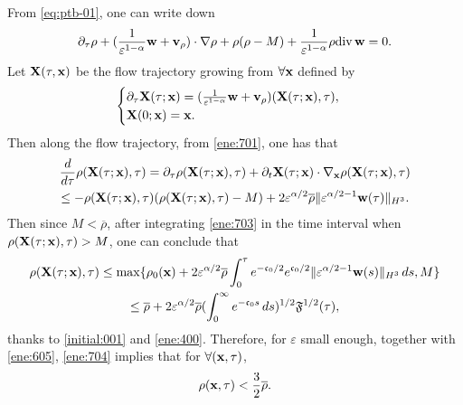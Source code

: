 \documentclass[11pt]{article}
\theoremstyle{plain}
\theoremstyle{definition}
\theoremstyle{remark}
\newcommand{\dt}{\partial_t}
\newcommand{\dtau}{\partial_\tau}
\newcommand{\dv}{\mathrm{div}\, }
\renewcommand{\vec}[1]{{\bf #1}}
\newcommand{\norm}[2]{\Vert #1 \Vert_{#2}}
\numberwithin{equation}{section}
\begin{document}
From \eqref{eq:ptb-01}, one can write down 
\begin{equation}
    \label{ene:701}
    \dtau \rho + (\frac{1}{\varepsilon^{1-\alpha}}\vec w + \vec v_\rho) \cdot \nabla \rho  + \rho (\rho - M)  + \frac{1}{\varepsilon^{1-\alpha}} \rho \dv \vec w  = 0.
\end{equation}
Let $ \vec X(\tau,\vec x) $ be the flow trajectory growing from $ \forall \vec x $ defined by
\begin{equation}
    \label{ene:702}
    \begin{cases}
        \partial_\tau \vec X(\tau; \vec x) = (\frac{1}{\varepsilon^{1-\alpha}}\vec w + \vec v_\rho) (\vec X(\tau; \vec x), \tau), \\
        \vec X(0;\vec x)=\vec x.
    \end{cases}
\end{equation}
Then along the flow trajectory, from \eqref{ene:701}, one has that
\begin{equation}
    \label{ene:703}
    \begin{gathered}
    \dfrac{d}{d\tau} \rho(\vec X(\tau; \vec x), \tau ) = \partial_\tau \rho (\vec X(\tau; \vec x), \tau ) + \dt \vec X(\tau;\vec x) \cdot \nabla_{\vec x} \rho (\vec X(\tau; \vec x), \tau ) \\
    \leq - \rho (\vec X(\tau; \vec x), \tau ) (\rho (\vec X(\tau; \vec x), \tau ) - M) + 2 \varepsilon^{\alpha/2} \overline \rho\norm{\varepsilon^{\alpha/2-1}\vec w(\tau)}{H^3}.
\end{gathered}
\end{equation}
Then since $ M < \overline \rho $, after integrating \eqref{ene:703} in the time interval when $ \rho(\vec X(\tau;\vec x),\tau) > M $, one can conclude that
\begin{equation}
    \label{ene:704}
\begin{gathered}
    \rho(\vec X(\tau;\vec x),\tau) \leq \max\lbrace \rho_0(\vec x) + 2 \varepsilon^{\alpha/2} \overline\rho \int_0^\tau  e^{-\mathfrak c_0/2} e^{\mathfrak c_0/2} \norm{\varepsilon^{\alpha/2-1}\vec w(s)}{H^3} \,ds, M \rbrace \\
    \leq \overline \rho + 2 \varepsilon^{\alpha/2} \overline \rho  (\int_0^\infty e^{-\mathfrak c_0s}\,ds)^{1/2} \mathfrak F^{1/2}(\tau),
\end{gathered}
\end{equation}
thanks to \eqref{initial:001} and \eqref{ene:400}. 
Therefore, for $ \varepsilon $ small enough, together with \eqref{ene:605}, \eqref{ene:704} implies that for $ \forall (\vec x, \tau) $, 
\begin{equation}
    \label{ene:705}
    \rho(\vec x, \tau) < \frac{3}{2} \overline\rho . 
\end{equation}
\end{document}
